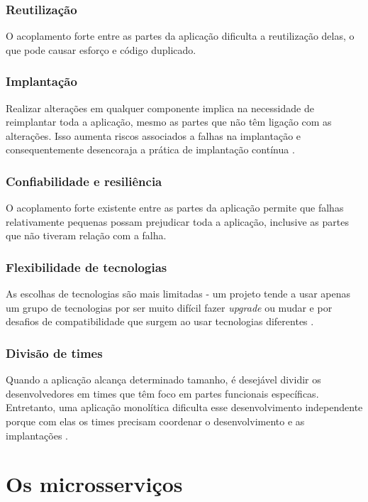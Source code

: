 \subsubsection{Reutilização}
O acoplamento forte entre as partes da aplicação dificulta a reutilização delas, o que pode causar esforço e código duplicado.

\subsubsection{Implantação}
Realizar alterações em qualquer componente implica na necessidade de reimplantar toda a aplicação, mesmo as partes que não têm ligação com as alterações. Isso aumenta riscos associados a falhas na implantação e consequentemente desencoraja a prática de implantação contínua \cite{microservicesIO_monolithic_architecture}.

\subsubsection{Confiabilidade e resiliência}
O acoplamento forte existente entre as partes da aplicação permite que falhas relativamente pequenas possam prejudicar toda a aplicação, inclusive as partes que não tiveram relação com a falha.

\subsubsection{Flexibilidade de tecnologias}
As escolhas de tecnologias são mais limitadas - um projeto tende a usar apenas um grupo de tecnologias por ser muito difícil fazer \emph{upgrade} ou mudar e por desafios de compatibilidade que surgem ao usar tecnologias diferentes \cite{microservicesIO_monolithic_architecture}.

\subsubsection{Divisão de times}
Quando a aplicação alcança determinado tamanho, é desejável dividir os desenvolvedores em times que têm foco em partes funcionais específicas. Entretanto, uma aplicação monolítica dificulta esse desenvolvimento independente porque com elas os times precisam coordenar o desenvolvimento e as implantações \cite{microservicesIO_monolithic_architecture}.

\section{Os microsserviços}

